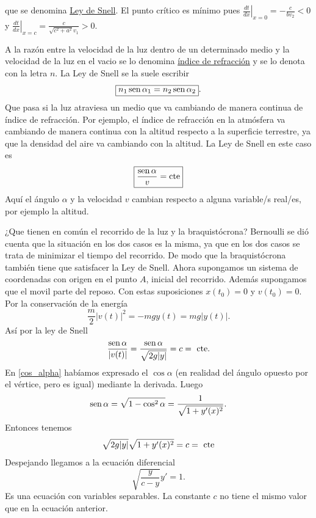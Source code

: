 \begin{subappendices}
que se denomina \href{http://es.wikipedia.org/wiki/Ley_de_Snell}{Ley de Snell}. El punto crítico es mínimo pues $\left.\frac{dt}{dx}\right|_{x=0}=-\tfrac{c}{bv_2}<0$ y
$\left.\frac{dt}{dx}\right|_{x=c}=\tfrac{c}{\sqrt{c^2+a^2}v_1}>0$.

 A la razón entre la velocidad de la luz dentro de un determinado medio y la velocidad de la luz en el vacio se lo denomina
\href{http://es.wikipedia.org/wiki/Índice_de_refracción}{índice de refracción} y se lo denota con la letra $n$. La Ley de Snell se la suele escribir
\[\boxed{n_1\sen\alpha_1=n_2\sen\alpha_2 }.\]
Que pasa si la luz atraviesa un medio que va cambiando de manera continua de índice de refracción. Por ejemplo, el índice de refracción en la atmósfera
va cambiando de manera continua con la altitud respecto a la superficie terrestre, ya que la densidad del aire va cambiando con la altitud. La Ley de
Snell en este caso es
\[\boxed{\frac{\sen\alpha}{v}=\text{cte}}\]
Aquí el ángulo $\alpha$ y la velocidad $v$ cambian respecto a alguna variable/s real/es, por ejemplo la altitud.


¿Que tienen en común el recorrido de la luz y la braquistócrona? Bernoulli se dió cuenta que la situación en los dos casos es la misma, ya que en los dos casos
se trata de minimizar el tiempo del recorrido. De modo que la braquistócrona también tiene que satisfacer la Ley de Snell.
 Ahora supongamos un sistema de coordenadas con origen en el punto $A$, inicial del recorrido.  Además supongamos que el movil  parte
del reposo. Con estas suposiciones $x(t_0)=0$ y $v(t_0)=0$. Por la conservación de la energía
\[\frac{m}{2}|v(t)|^2=-mgy(t)=mg|y(t)|.\]
 Así por la ley de Snell
\[\frac{\sen\alpha}{|v(t)|}=\frac{\sen\alpha}{\sqrt{2g|y|}}=c=\text{ cte}.\]
En \eqref{cos_alpha} habíamos expresado el $\cos\alpha$ (en realidad del ángulo opuesto por el vértice, pero es igual) mediante la derivada. Luego
\[\sen\alpha=\sqrt{1-\cos^2\alpha}=\frac{1}{\sqrt{1+y'(x)^2}}.\]
Entonces tenemos
\[\sqrt{2g|y|}\sqrt{1+y'(x)^2}=c=\hbox{ cte}\]
Despejando llegamos a la ecuación diferencial
\[\boxed{\sqrt{\frac{y}{c-y}}y'=1}.\]
Es una ecuación con variables separables. La constante $c$ no tiene el mismo valor que en la ecuación anterior.


\end{subappendices}
